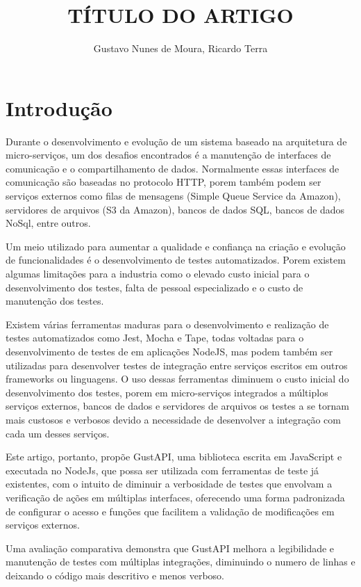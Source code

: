 \documentclass[10pt,brazil,english]{article}
\title{TÍTULO DO ARTIGO}
\author{Gustavo Nunes de Moura, Ricardo Terra}
\begin{document}
\pagestyle{fancy} %

\maketitle
\newpage


\section{Introdução}
Durante o desenvolvimento e evolução de um sistema baseado na arquitetura de micro-serviços, um dos desafios encontrados é a manutenção de interfaces de comunicação e o compartilhamento de dados. Normalmente essas interfaces de comunicação são baseadas no protocolo HTTP, porem também podem ser serviços externos como filas de mensagens (Simple Queue Service da Amazon), servidores de arquivos (S3 da Amazon), bancos de dados SQL, bancos de dados NoSql, entre outros. 

Um meio utilizado para aumentar a qualidade e confiança na criação e evolução de funcionalidades é o desenvolvimento de testes automatizados. Porem existem algumas limitações para a industria como o elevado custo inicial para o desenvolvimento dos testes, falta de pessoal especializado e o custo de manutenção dos testes.

Existem várias ferramentas maduras para o desenvolvimento e realização de testes automatizados como Jest, Mocha e Tape, todas voltadas para o desenvolvimento de testes de em aplicações NodeJS, mas podem também ser utilizadas para desenvolver testes de integração entre serviços escritos em outros frameworks ou linguagens. O uso dessas ferramentas diminuem o custo inicial do desenvolvimento dos testes, porem em micro-serviços integrados a múltiplos serviços externos, bancos de dados e servidores de arquivos os testes a se tornam mais custosos e verbosos devido a necessidade de desenvolver a integração com cada um desses serviços.

Este artigo, portanto, propõe GustAPI, uma biblioteca escrita em JavaScript e executada no NodeJs, que possa ser utilizada com ferramentas de teste já existentes, com o intuito de diminuir a verbosidade de testes que envolvam a verificação de ações em múltiplas interfaces, oferecendo uma forma padronizada de configurar o acesso e funções que facilitem a validação de modificações em serviços externos.

Uma avaliação comparativa demonstra que GustAPI melhora a legibilidade e manutenção de testes com múltiplas integrações, diminuindo o numero de linhas e deixando o código mais descritivo e menos verboso.
\end{document}
